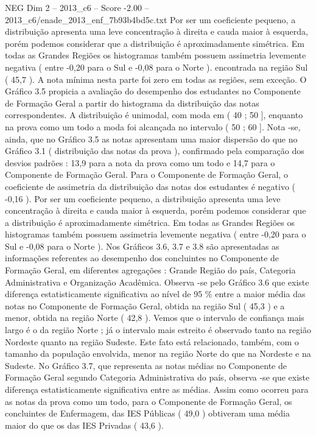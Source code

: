 \begin{textsample}{NEG Dim 2 – 2013\_c6 – Score -2.00 – 2013\_c6/enade\_2013\_enf\_7b93b4bd5c.txt}
Por ser um coeficiente pequeno, a distribuição apresenta uma leve concentração à direita e cauda maior à esquerda, porém podemos considerar que a distribuição é aproximadamente simétrica.
Em todas as Grandes Regiões os histogramas também possuem assimetria levemente negativa ( entre -0,20 para o Sul e -0,08 para o Norte ). encontrada na região Sul ( 45,7 ).
A nota mínima nesta parte foi zero em todas as regiões, sem exceção.
O Gráfico 3.5 propicia a avaliação do desempenho dos estudantes no Componente de Formação Geral a partir do histograma da distribuição das notas correspondentes.
A distribuição é unimodal, com moda em ( 40 ; 50 ], enquanto na prova como um todo a moda foi alcançada no intervalo ( 50 ; 60 ].
Nota -se, ainda, que no Gráfico 3.5 as notas apresentam uma maior dispersão do que no Gráfico 3.1 ( distribuição das notas da prova ), confirmado pela comparação dos desvios padrões : 13,9 para a nota da prova como um todo e 14,7 para o Componente de Formação Geral.
Para o Componente de Formação Geral, o coeficiente de assimetria da distribuição das notas dos estudantes é negativo ( -0,16 ).
Por ser um coeficiente pequeno, a distribuição apresenta uma leve concentração à direita e cauda maior à esquerda, porém podemos considerar que a distribuição é aproximadamente simétrica.
Em todas as Grandes Regiões os histogramas também possuem assimetria levemente negativa ( entre -0,20 para o Sul e -0,08 para o Norte ).
Nos Gráficos 3.6, 3.7 e 3.8 são apresentadas as informações referentes ao desempenho dos concluintes no Componente de Formação Geral, em diferentes agregações : Grande Região do país, Categoria Administrativa e Organização Acadêmica.
Observa -se pelo Gráfico 3.6 que existe diferença estatisticamente significativa ao nível de 95 \% entre a maior média das notas no Componente de Formação Geral, obtida na região Sul ( 45,3 ) e a menor, obtida na região Norte ( 42,8 ).
Vemos que o intervalo de confiança mais largo é o da região Norte ; já o intervalo mais estreito é observado tanto na região Nordeste quanto na região Sudeste.
Este fato está relacionado, também, com o tamanho da população envolvida, menor na região Norte do que na Nordeste e na Sudeste.
No Gráfico 3.7, que representa as notas médias no Componente de Formação Geral segundo Categoria Administrativa do país, observa -se que existe diferença estatisticamente significativa entre as médias.
Assim como ocorreu para as notas da prova como um todo, para o Componente de Formação Geral, os concluintes de Enfermagem, das IES Públicas ( 49,0 ) obtiveram uma média maior do que os das IES Privadas ( 43,6 ).

\end{textsample}
